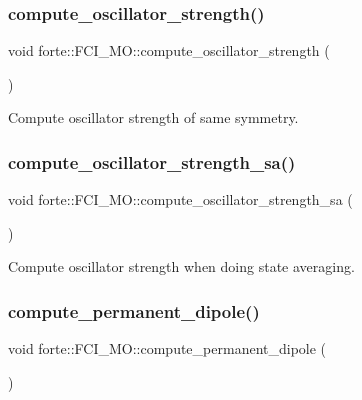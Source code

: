 \subsubsection{\texorpdfstring{compute\+\_\+oscillator\+\_\+strength()}{compute\_oscillator\_strength()}}
{\footnotesize\ttfamily void forte\+::\+F\+C\+I\+\_\+\+M\+O\+::compute\+\_\+oscillator\+\_\+strength (\begin{DoxyParamCaption}{ }\end{DoxyParamCaption})\hspace{0.3cm}{\ttfamily [protected]}}



Compute oscillator strength of same symmetry. 

\mbox{\label{classforte_1_1_f_c_i___m_o_ae0ee9bf49c50f51da8ceeb9c5ca91bbe}} 
\subsubsection{\texorpdfstring{compute\+\_\+oscillator\+\_\+strength\+\_\+sa()}{compute\_oscillator\_strength\_sa()}}
{\footnotesize\ttfamily void forte\+::\+F\+C\+I\+\_\+\+M\+O\+::compute\+\_\+oscillator\+\_\+strength\+\_\+sa (\begin{DoxyParamCaption}{ }\end{DoxyParamCaption})\hspace{0.3cm}{\ttfamily [protected]}}



Compute oscillator strength when doing state averaging. 

\mbox{\label{classforte_1_1_f_c_i___m_o_a0e279e21ec5dfc1e82799d2a8a9d00d1}} 
\subsubsection{\texorpdfstring{compute\+\_\+permanent\+\_\+dipole()}{compute\_permanent\_dipole()}}
{\footnotesize\ttfamily void forte\+::\+F\+C\+I\+\_\+\+M\+O\+::compute\+\_\+permanent\+\_\+dipole (\begin{DoxyParamCaption}{ }\end{DoxyParamCaption})\hspace{0.3cm}{\ttfamily [protected]}}



